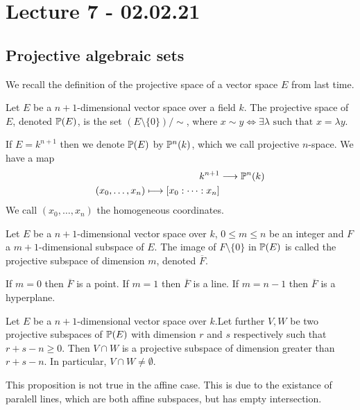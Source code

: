 
\section{Lecture 7 - 02.02.21}

\subsection{Projective algebraic sets}

We recall the definition of the projective space of a vector space $E$ from last time. 

\begin{definition}
Let $E$ be a $n+1$-dimensional vector space over a field $k$. The projective space of $E$, denoted $\P(E)$, is the set $(E\setminus \{0\})/\sim$, where $x\sim y \iff \exists \lambda \text{ such that } x=\lambda y$. 
\end{definition}

If $E=k^{n+1}$ then we denote $\P(E)$ by $\P^n(k)$, which we call projective $n$-space. We have a map 
\begin{align*}
    k^{n+1}&\longrightarrow \P^n(k) \\
    (x_0, \ldots, x_n)\longmapsto [x_0:\cdots :x_n]
\end{align*}
We call $(x_0, \ldots, x_n)$ the homogeneous coordinates. 

\begin{definition}
Let $E$ be a $n+1$-dimensional vector space over $k$, $0\leq m\leq n$ be an integer and $F$ a $m+1$-dimensional subspace of $E$. The image of $F\setminus \{0\}$ in $\P(E)$ is called the projective subspace of dimension $m$, denoted $\overline{F}$. 
\end{definition}

If $m=0$ then $\overline{F}$ is a point. If $m=1$ then $\overline{F}$ is a line. If $m=n-1$ then $\overline{F}$ is a hyperplane. 

\begin{proposition}
Let $E$ be a $n+1$-dimensional vector space over $k$.Let further $V, W$ be two projective subspaces of $\P(E)$ with dimension $r$ and $s$ respectively such that $r+s-n\geq 0$. Then $V\cap W$ is a projective subspace of dimension greater than $r+s-n$. In particular, $V\cap W\neq \emptyset$.  
\end{proposition}

\begin{remark}
     This proposition is not true in the affine case. This is due to the existance of paralell lines, which are both affine subspaces, but has empty intersection. 
\end{remark}

